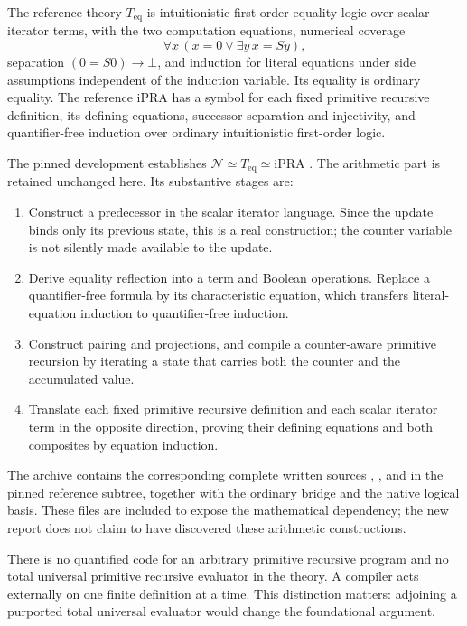 \documentclass[11pt,a4paper]{article}
\theoremstyle{definition}
\newcommand{\ipra}{\mathrm{iPRA}}
\newcommand{\Teq}{T_{\mathrm{eq}}}
\begin{document}
The reference theory $\Teq$ is intuitionistic first-order equality logic
over scalar iterator terms, with the two computation equations,
numerical coverage
\[
\forall x\,(x=0\vee\exists y\,x=Sy),
\]
separation $(0=S0)\to\bot$, and induction for literal equations under
side assumptions independent of the induction variable. Its equality
is ordinary equality. The reference iPRA has a symbol for each fixed
primitive recursive definition, its defining equations, successor
separation and injectivity, and quantifier-free induction over ordinary
intuitionistic first-order logic.

The pinned development establishes $\mathcal N\simeq\Teq\simeq\ipra$
\cite{bridge}. The arithmetic part is retained unchanged here. Its
substantive stages are:
\begin{enumerate}
\item Construct a predecessor in the scalar iterator language. Since the
update binds only its previous state, this is a real construction; the
counter variable is not silently made available to the update.
\item Derive equality reflection into a term and Boolean operations.
Replace a quantifier-free formula by its characteristic equation, which
transfers literal-equation induction to quantifier-free induction.
\item Construct pairing and projections, and compile a counter-aware
primitive recursion by iterating a state that carries both the counter
and the accumulated value.
\item Translate each fixed primitive recursive definition and each
scalar iterator term in the opposite direction, proving their defining
equations and both composites by equation induction.
\end{enumerate}

The archive contains the corresponding complete written sources
, , and
 in the pinned reference subtree, together
with the ordinary bridge and the native logical basis. These files are
included to expose the mathematical dependency; the new report does
not claim to have discovered these arithmetic constructions.

There is no quantified code for an arbitrary primitive recursive
program and no total universal primitive recursive evaluator in the
theory. A compiler acts externally on one finite definition at a time.
This distinction matters: adjoining a purported total universal
evaluator would change the foundational argument.
\end{document}
